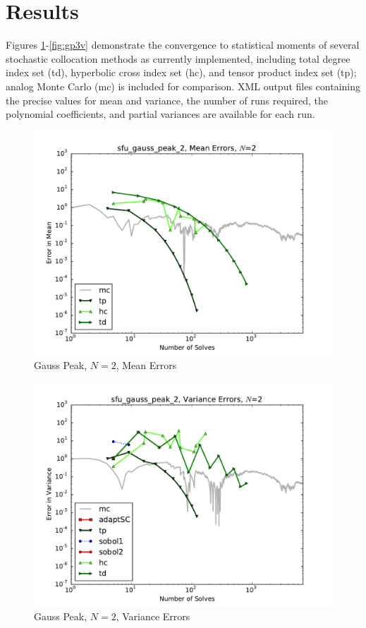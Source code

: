 \documentclass[11pt]{article}
\begin{document}
\section{Results}
Figures \ref{fig:gp2m}-\ref{fig:gp3v} demonstrate the convergence to statistical moments 
of several stochastic collocation methods as currently implemented,
including total degree index set (td), hyperbolic cross index set (hc),
and tensor product index set (tp); analog Monte Carlo (mc) is included for comparison.  XML output files
containing the precise values for mean and variance, the number of runs required, the polynomial coefficients,
and partial variances are available for each run.
\begin{figure}[H]
  \centering
  \includegraphics[width=0.7\linewidth]{sfu_gauss_peak_2_mean_errs.pdf}
  \caption{Gauss Peak, $N=2$, Mean Errors}
  \label{fig:gp2m}
\end{figure}
\begin{figure}[H]
  \centering
  \includegraphics[width=0.7\linewidth]{sfu_gauss_peak_2_variance_errs.pdf}
  \caption{Gauss Peak, $N=2$, Variance Errors}
  \label{fig:gp2v}
\end{figure}
\end{document}
